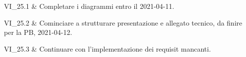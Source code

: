 VI\_25.1 & Completare i diagrammi entro il 2021-04-11.

\tabularnewline

VI\_25.2 & Cominciare a strutturare presentazione e allegato tecnico, da finire per la PB, 2021-04-12.

\tabularnewline

VI\_25.3 & Continuare con l'implementazione dei requisit mancanti.

